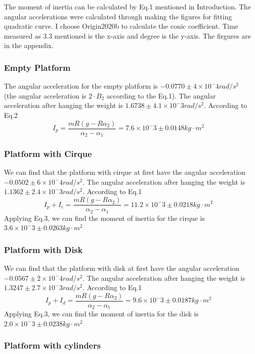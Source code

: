 \documentclass[12pt,a4paper]{article}
\begin{document}
The moment of inertia can be calculated by Eq.1 mentioned in Introduction. The angular accelerations were calculated through making the figures for fitting quadratic curve. I choose Origin2020b to calculate the conic coefficient. Time measured as 3.3 mentioned is the x-axis and degree is the y-axis. The firgures are in the appendix.

\subsubsection{Empty Platform}

 The angular acceleration for the empty platform is $-0.0770\pm 4\times 10^-4rad/s^2$ (the angular acceleration is $2\cdot B_2$ according to the Eq.1). The angular acceleration after hanging the weight is $1.6738\pm4.1\times 10^-3 rad/s^2$. According to Eq.2
$$I_p=\frac{mR(g-R\alpha_2)}{\alpha_2-\alpha_1}=7.6 \times 10^-3\pm 0.0148kg\cdot m^2$$

\subsubsection{Platform with Cirque}

We can find that the platform with cirque at first have the angular acceleration $-0.0502\pm 6\times 10^-4rad/s^2$. The angular acceleration after hanging the weight is $1.1362\pm 2.4\times 10^-3rad/s^2$. According to Eq.1 $$I_p+I_c=\frac{mR(g-R\alpha_2)}{\alpha_2-\alpha_1}=11.2\times 10^-3\pm 0.0218kg\cdot m^2$$ Applying Eq.3, we can find the moment of inertia for the cirque is $3.6\times 10^-3\pm 0.0263kg\cdot m^2$

\subsubsection{Platform with Disk}

We can find that the platform with disk at first have the angular acceleration $-0.0567\pm 2\times 10^-4rad/s^2$. The angular acceleration after hanging the weight is $1.3247\pm 2.7 \times 10^-3rad/s^2$. According to Eq.1 $$I_p+I_d=\frac{mR(g-R\alpha_2)}{\alpha_2-\alpha_1}=9.6 \times 10^-3\pm 0.0187kg\cdot m^2$$ Applying Eq.3, we can find the moment of inertia for the disk is $2.0\times 10^-3\pm 0.0238kg\cdot m^2$

\subsubsection{Platform with cylinders}
\end{document}
